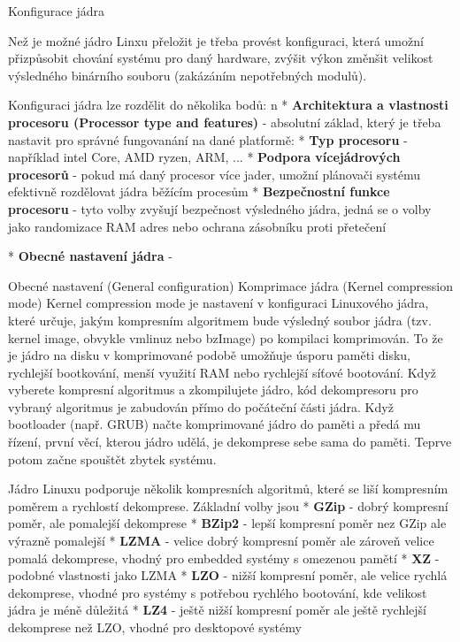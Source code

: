 \chap Konfigurace jádra 

Než je možné jádro Linxu přeložit je třeba provést konfiguraci, která umožní přizpůsobit chování systému pro daný hardware, zvýšit výkon změnšit velikost výsledného binárního souboru (zakázáním nepotřebných modulů). 

Konfiguraci jádra lze rozdělit do několika bodů:
\begitems \style n
* {\bf Architektura a vlastnosti procesoru (Processor type and features)} - absolutní základ, který je třeba nastavit pro správné fungovanání na dané platformě:
    \begitems
        * {\bf Typ procesoru} - například intel Core, AMD ryzen, ARM, ...
        * {\bf Podpora vícejádrových procesorů} - pokud má daný procesor více jader, umožní plánovači systému efektivně rozdělovat jádra běžícím procesům
        * {\bf Bezpečnostní funkce procesoru} - tyto volby zvyšují bezpečnost výsledného jádra, jedná se o volby jako randomizace RAM adres nebo ochrana zásobníku proti přetečení
    \enditems

* {\bf Obecné nastavení jádra} - 
\enditems

\sec Obecné nastavení (General configuration) 
\secc Komprimace jádra (Kernel compression mode) 
Kernel compression mode je nastavení v konfiguraci Linuxového jádra, které určuje, jakým kompresním algoritmem bude výsledný soubor jádra (tzv. kernel image, obvykle vmlinuz nebo bzImage) po kompilaci komprimován. To že je jádro na disku v komprimované podobě umožňuje úsporu paměti disku, rychlejší bootkování, menší využití RAM nebo rychlejší síťové bootování. Když vyberete kompresní algoritmus a zkompilujete jádro, kód dekompresoru pro vybraný algoritmus je zabudován přímo do počáteční části jádra. Když bootloader (např. GRUB) načte komprimované jádro do paměti a předá mu řízení, první věcí, kterou jádro udělá, je dekomprese sebe sama do paměti. Teprve potom začne spouštět zbytek systému.

Jádro Linuxu podporuje několik kompresních algoritmů, které se liší kompresním poměrem a rychlostí dekomprese. Základní volby jsou
\begitems 
* {\bf GZip} - dobrý kompresní poměr, ale pomalejší dekomprese
* {\bf BZip2} - lepší kompresní poměr nez GZip ale výrazně pomalejší
* {\bf LZMA} - velice dobrý kompresní poměr ale zároveň velice pomalá dekomprese, vhodný pro embedded systémy s omezenou pamětí
* {\bf XZ} - podobné vlastnosti jako LZMA
* {\bf LZO} - nižší kompresní poměr, ale velice rychlá dekomprese, vhodné pro systémy s potřebou rychlého bootování, kde velikost jádra je méně důležitá
* {\bf LZ4} - ještě nižší kompresní poměr ale ještě rychlejší dekomprese než LZO, vhodné pro desktopové systémy 
\enditems

